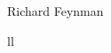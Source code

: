 \documentclass[
12pt, %
oneside, %
english, %
singlespacing, %
liststotoc, %
parskip, %
headsepline, %
]{main} %
\begin{document}
\hfill Richard Feynman


\tableofcontents %

\listoffigures %

\listoftables %


\begin{abbreviations}{ll} %


\end{abbreviations}
\end{document}
